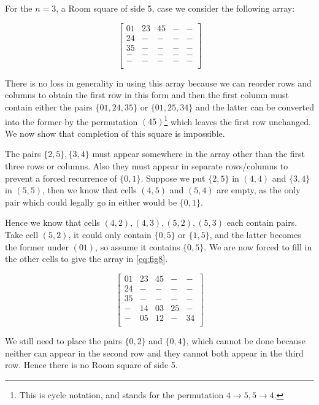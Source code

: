 \begin{example}
For the $n = 3$, a Room square of side 5, case we consider the following array:

\begin{equation}
  \begin{bmatrix}
    01 & 23 & 45 & - & -  \\
    24 &  - &  - & - & -  \\
    35 &  - &  - & - & -  \\
     - &  - &  - & - & -  \\
     - &  - &  - & - & -  \\
  \end{bmatrix}
\end{equation}

There is no loss in generality in using this array because we can reorder rows and columns to obtain the first row in this form and then the first column must contain either the pairs $\{01, 24, 35\}$ or $\{01, 25, 34\}$ and the latter can be converted into the former by the permutation $(45)$\footnote{This is cycle notation, and stands for the permutation $4 \rightarrow 5, 5 \rightarrow 4$.}
which leaves the first row unchanged.
We now show that completion of this square is impossible.

The pairs $\{2,5\},\{3,4\}$ must appear somewhere in the array other than the first three rows or columns.
Also they must appear in separate rows/columns to prevent a forced recurrence of $\{0, 1\}$.
Suppose we put $\{2, 5\}$ in $(4, 4)$ and $\{3, 4\}$ in $(5, 5)$, then we know that cells $(4, 5)$ and $(5, 4)$ are empty, as the only pair which could legally go in either would be $\{0, 1\}$.

Hence we know that cells $(4, 2), (4, 3), (5, 2), (5, 3)$ each contain pairs.
Take cell $(5, 2)$, it could only contain $\{0, 5\}$ or $\{1, 5\}$, and the latter becomes the former under $(01)$, so assume it contains $\{0, 5\}$.
We are now forced to fill in the other cells to give the array in \eqref{eq:fig8}.

\begin{equation}
  \label{eq:fig8}
  \begin{bmatrix}
    01 & 23 & 45 &  - & -  \\
    24 &  - &  - &  - & -  \\
    35 &  - &  - &  - & -  \\
     - & 14 & 03 & 25 & -  \\
     - & 05 & 12 &  - & 34 \\
  \end{bmatrix}
\end{equation}

We still need to place the pairs $\{0, 2\}$ and $\{0, 4\}$, which cannot be done because neither can appear in the second row and they cannot both appear in the third row.
Hence there is no Room square of side 5.
\label{eg:order5}
\end{example}

